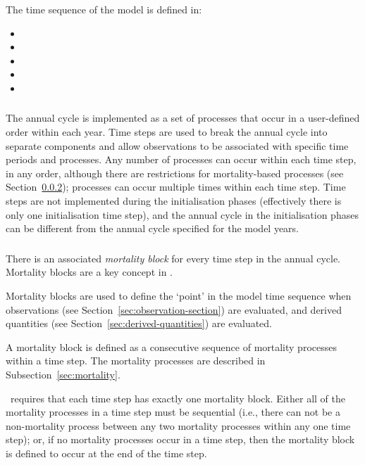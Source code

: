 The time sequence of the model is defined in:

\begin{itemize}
  \item {}
  \item {}
  \item {}
  \item {}
  \item {}
\end{itemize}

\subsubsection{}

The annual cycle is implemented as a set of processes that occur in a user-defined order within each year. Time steps are used to break the annual cycle into separate components and allow observations to be associated with specific time periods and processes. Any number of processes can occur within each time step, in any order, although there are restrictions for mortality-based processes (see Section~\ref{sec:mortality_block}); processes can occur multiple times within each time step. Time steps are not implemented during the initialisation phases (effectively there is only one initialisation time step), and the annual cycle in the initialisation phases can be different from the annual cycle specified for the model years.

\subsubsection{}\label{sec:mortality_block}

There is an associated \emph{mortality block} for every time step in the annual cycle. Mortality blocks are a key concept in \CNAME.

Mortality blocks are used to define the `point' in the model time sequence when observations (see Section~\ref{sec:observation-section}) are evaluated, and derived quantities (see Section~\ref{sec:derived-quantities}) are evaluated.

A mortality block is defined as a consecutive sequence of mortality processes within a time step. The mortality processes are described in Subsection~\ref{sec:mortality}.

\CNAME\ requires that each time step has exactly one mortality block. Either all of the mortality processes in a time step must be sequential (i.e., there can not be a non-mortality process between any two mortality processes within any one time step); or, if no mortality processes occur in a time step, then the mortality block is defined to occur at the end of the time step.

